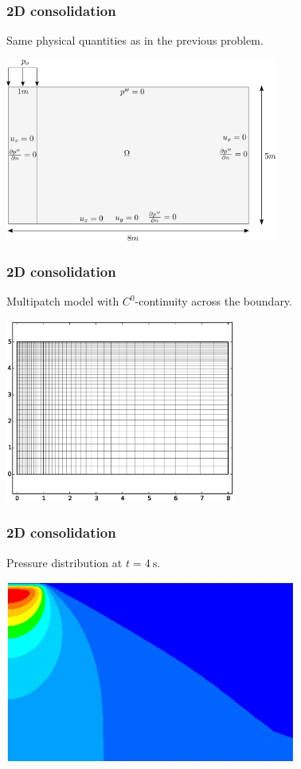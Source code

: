 \documentclass{beamer}
\begin{document}
\begin{frame}
  \frametitle{2D consolidation}

  Same physical quantities as in the previous problem.
  \begin{center}
    \includegraphics[height=6cm]{figs/Benchmark3}
  \end{center}
\end{frame}

\begin{frame}
  \frametitle{2D consolidation}

  Multipatch model with $C^0$-continuity across the boundary.
  \begin{center}
    \includegraphics[height=6cm]{figs/OGSBenchmark2Dgraded}
  \end{center}
\end{frame}

\begin{frame}
  \frametitle{2D consolidation}

  Pressure distribution at $t = \SI{4}{\second}$.
  \begin{center}
    \includegraphics[height=6cm]{figs/OGS2DExcessPorePrDist}
  \end{center}
\end{frame}
\end{document}
